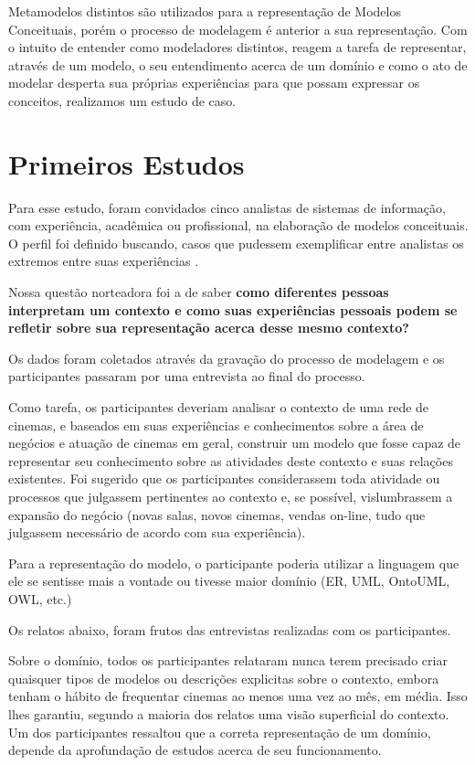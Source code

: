 Metamodelos distintos são utilizados para a representação de Modelos Conceituais, porém o processo de modelagem é anterior a sua representação. Com o intuito de entender como modeladores distintos, reagem a tarefa de representar, através de um modelo, o seu entendimento acerca de um domínio e como o ato de modelar desperta sua próprias experiências para que possam expressar os conceitos, realizamos um estudo de caso.

\section{\hspace*{3pt} Primeiros Estudos}
\label{sec:estudos}

Para esse estudo, foram convidados cinco analistas de sistemas de informação, com experiência, acadêmica ou profissional, na elaboração de modelos conceituais. O perfil foi definido buscando, casos que pudessem exemplificar entre analistas os extremos entre suas experiências \cite{wainer:2007.metodos}.

Nossa questão norteadora foi a de saber \textbf{como diferentes pessoas interpretam um contexto e como suas experiências pessoais podem se refletir sobre sua representação acerca desse mesmo contexto?}

Os dados foram coletados através da gravação do processo de modelagem e os participantes passaram por uma entrevista ao final do processo.

Como tarefa, os participantes deveriam analisar o contexto de uma rede de cinemas, e baseados em suas experiências e conhecimentos sobre a área de negócios e atuação de cinemas em geral, construir um modelo que fosse capaz de representar seu conhecimento sobre as atividades deste contexto e suas relações existentes. Foi sugerido que os participantes considerassem toda atividade ou processos que julgassem pertinentes ao contexto e, se possível, vislumbrassem a expansão do negócio (novas salas, novos cinemas, vendas on-line, tudo que julgassem necessário de acordo com sua experiência).

Para a representação do modelo, o participante poderia utilizar a linguagem que ele se sentisse mais a vontade ou tivesse maior domínio (ER, UML, OntoUML, OWL, etc.)

Os relatos abaixo, foram frutos das entrevistas realizadas com os participantes.

Sobre o domínio, todos os participantes relataram nunca terem precisado criar quaisquer tipos de modelos ou descrições explicitas sobre o contexto, embora tenham o hábito de frequentar cinemas ao menos uma vez ao mês, em média. Isso lhes garantiu, segundo a maioria dos relatos uma visão superficial do  contexto. Um dos participantes ressaltou que a correta representação de um domínio, depende da aprofundação de estudos acerca de seu funcionamento.

